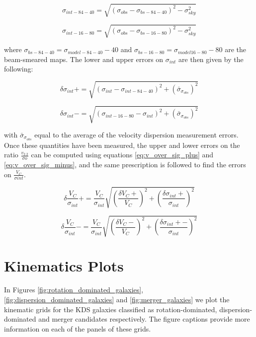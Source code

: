 \documentclass[fleqn,usenatbib]{mnras}
\begin{document}
\begin{equation}\label{eq:sig_84_40}
   \sigma_{int-84-40} = \sqrt{(\sigma_{obs} - \sigma_{bs-84-40})^{2} - \sigma_{sky}^{2}}
\end{equation}

\begin{equation}\label{eq:sig_16_80}
   \sigma_{int-16-80} = \sqrt{\left(\sigma_{obs} - \sigma_{bs-16-80}\right)^{2} - \sigma_{sky}^{2}}
\end{equation}

where $\sigma_{bs-84-40} = \sigma_{model-84-40} - 40$ and $\sigma_{bs-16-80} = \sigma_{model16-80} - 80$ are the beam-smeared maps.
The lower and upper errors on $\sigma_{int}$ are then given by the following:

\begin{equation}\label{eq:sig_plus_error}
   \delta\sigma_{int}+ = \sqrt{\left(\sigma_{int} - \sigma_{int-84-40}\right)^{2} + \left(\bar{\sigma}_{\sigma_{obs}}\right)^{2}}
\end{equation}

\begin{equation}\label{eq:sig_minus_error}
   \delta\sigma_{int}- = \sqrt{\left(\sigma_{int-16-80} - \sigma_{int}\right)^{2} + \left(\bar{\sigma}_{\sigma_{obs}}\right)^{2}}
\end{equation}

with $\bar{\sigma}_{\sigma_{obs}}$ equal to the average of the velocity dispersion measurement errors.
Once these quantities have been measured, the upper and lower errors on the ratio $\frac{v_{2.2}}{\sigma{o}}$ can be computed using equations \ref{eq:v_over_sig_plus} and \ref{eq:v_over_sig_minus}, and the same prescription is followed to find the errors on $\frac{V_{C}}{\sigma{int}}$.

\begin{equation}\label{eq:v_over_sig_plus}
   \delta\frac{V_{C}}{\sigma_{int}}+ = \frac{V_{C}}{\sigma_{int}}\sqrt{\left(\frac{\delta V_{C}+}{V_{C}}\right)^{2} + \left(\frac{\delta\sigma_{int}+}{\sigma_{int}}\right)^{2}}
\end{equation}

\begin{equation}\label{eq:v_over_sig_minus}
   \delta\frac{V_{C}}{\sigma_{int}}- = \frac{V_{C}}{\sigma_{int}}\sqrt{\left(\frac{\delta V_{C}-}{V_{C}}\right)^{2} + \left(\frac{\delta\sigma_{int}+-}{\sigma_{int}}\right)^{2}}
\end{equation}

\section{Kinematics Plots}\label{app:kinematics_plots}
In Figures \ref{fig:rotation_dominated_galaxies}, \ref{fig:dispersion_dominated_galaxies} and \ref{fig:merger_galaxies} we plot the kinematic grids for the KDS galaxies classified as rotation-dominated, dispersion-dominated and merger candidates respectively.
The figure captions provide more information on each of the panels of these grids.
\end{document}
